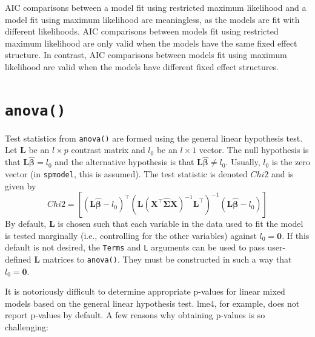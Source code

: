 \documentclass[10pt,letterpaper]{article}
\begin{document}
AIC comparisons between a model fit using restricted maximum likelihood
and a model fit using maximum likelihood are meaningless, as the models
are fit with different likelihoods. AIC comparisons between models fit
using restricted maximum likelihood are only valid when the models have
the same fixed effect structure. In contrast, AIC comparisons between
models fit using maximum likelihood are valid when the models have
different fixed effect structures.

\hypertarget{sec:anova}{%
\section{\texorpdfstring{\texttt{anova()}}{anova()}}\label{sec:anova}}

Test statistics from \texttt{anova()} are formed using the general
linear hypothesis test. Let \(\mathbf{L}\) be an \(l \times p\) contrast
matrix and \(l_0\) be an \(l \times 1\) vector. The null hypothesis is
that \(\mathbf{L} \boldsymbol{\hat{\beta}} = l_0\) and the alternative
hypothesis is that \(\mathbf{L} \boldsymbol{\hat{\beta}} \neq l_0\).
Usually, \(l_0\) is the zero vector (in \texttt{spmodel}, this is
assumed). The test statistic is denoted \(Chi2\) and is given by
\begin{equation*}\label{eq:glht}
  Chi2 = [(\mathbf{L} \boldsymbol{\hat{\beta}} - l_0)^\top(\mathbf{L} (\mathbf{X}^\top \mathbf{\hat{\Sigma}} \mathbf{X})^{-1} \mathbf{L}^\top)^{-1}(\mathbf{L} \boldsymbol{\hat{\beta}} - l_0)]
\end{equation*} By default, \(\mathbf{L}\) is chosen such that each
variable in the data used to fit the model is tested marginally (i.e.,
controlling for the other variables) against \(l_0 = \mathbf{0}\). If
this default is not desired, the \texttt{Terms} and \texttt{L} arguments
can be used to pass user-defined \(\mathbf{L}\) matrices to
\texttt{anova()}. They must be constructed in such a way that
\(l_0 = \mathbf{0}\).

It is notoriously difficult to determine appropriate p-values for linear
mixed models based on the general linear hypothesis test. lme4, for
example, does not report p-values by default. A few reasons why
obtaining p-values is so challenging:
\end{document}
